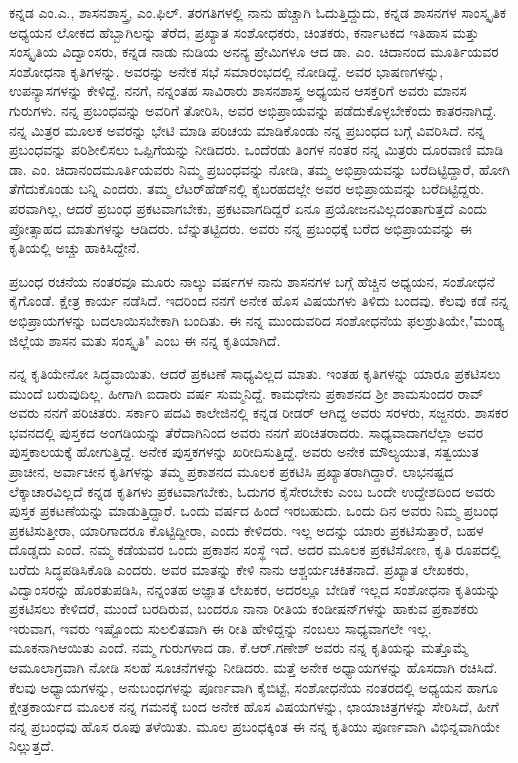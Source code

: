 ಕನ್ನಡ ಎಂ.ಎ., ಶಾಸನಶಾಸ್ತ್ರ, ಎಂ.ಫಿಲ್​. ತರಗತಿಗಳಲ್ಲಿ ನಾನು ಹೆಚ್ಚಾಗಿ ಓದುತ್ತಿದ್ದುದು, ಕನ್ನಡ ಶಾಸನಗಳ ಸಾಂಸ್ಕೃತಿಕ ಅಧ್ಯಯನ ಲೋಕದ ಹೆಬ್ಬಾಗಿಲನ್ನು ತೆರೆದ, ಪ್ರಖ್ಯಾತ ಸಂಶೋಧಕರು, ಚಿಂತಕರು,  ಕರ್ನಾಟಕದ ಇತಿಹಾಸ ಮತ್ತು ಸಂಸ್ಕೃತಿಯ ವಿದ್ವಾಂಸರು, ಕನ್ನಡ ನಾಡು ನುಡಿಯ ಅನನ್ಯ ಪ್ರೇಮಿಗಳೂ ಆದ ಡಾ. ಎಂ. ಚಿದಾನಂದ ಮೂರ್ತಿಯವರ ಸಂಶೋಧನಾ ಕೃತಿಗಳನ್ನು.  ಅವರನ್ನು ಅನೇಕ ಸಭೆ ಸಮಾರಂಭದಲ್ಲಿ ನೋಡಿದ್ದೆ. ಅವರ ಭಾಷಣಗಳನ್ನು, ಉಪನ್ಯಾಸಗಳನ್ನು ಕೇಳಿದ್ದೆ. ನನಗೆ, ನನ್ನಂತಹ ಸಾವಿರಾರು ಶಾಸನಶಾಸ್ತ್ರ ಅಧ್ಯಯನ ಆಸಕ್ತರಿಗೆ ಅವರು ಮಾನಸ ಗುರುಗಳು. ನನ್ನ ಪ್ರಬಂಧವನ್ನು ಅವರಿಗೆ ತೋರಿಸಿ, ಅವರ ಅಭಿಪ್ರಾಯವನ್ನು ಪಡೆದುಕೊಳ್ಳಬೇಕೆಂದು ಕಾತರನಾಗಿದ್ದೆ. ನನ್ನ ಮಿತ್ರರ ಮೂಲಕ ಅವರನ್ನು ಭೇಟಿ ಮಾಡಿ ಪರಿಚಯ ಮಾಡಿಕೊಂಡು ನನ್ನ ಪ್ರಬಂಧದ ಬಗ್ಗೆ ವಿವರಿಸಿದೆ. ನನ್ನ ಪ್ರಬಂಧವನ್ನು ಪರಿಶೀಲಿಸಲು ಒಪ್ಪಿಗೆಯನ್ನು ನೀಡಿದರು. ಒಂದೆರಡು ತಿಂಗಳ ನಂತರ ನನ್ನ ಮಿತ್ರರು ದೂರವಾಣಿ ಮಾಡಿ ಡಾ. ಎಂ. ಚಿದಾನಂದಮೂರ್ತಿಯವರು ನಿಮ್ಮ ಪ್ರಬಂಧವನ್ನು ನೋಡಿ, ತಮ್ಮ ಅಭಿಪ್ರಾಯವನ್ನು ಬರೆದಿಟ್ಟಿದ್ದಾರೆ, ಹೋಗಿ ತೆಗೆದುಕೊಂಡು ಬನ್ನಿ ಎಂದರು. ತಮ್ಮ ಲೆಟರ್​ಹೆಡ್​ನಲ್ಲಿ ಕೈಬರಹದಲ್ಲೇ ಅವರ ಅಭಿಪ್ರಾಯವನ್ನು ಬರೆದಿಟ್ಟಿದ್ದರು.  ಪರವಾಗಿಲ್ಲ, ಆದರೆ ಪ್ರಬಂಧ ಪ್ರಕಟವಾಗಬೇಕು, ಪ್ರಕಟವಾಗದಿದ್ದರೆ ಏನೂ ಪ್ರಯೋಜನವಿಲ್ಲದಂತಾಗುತ್ತದೆ ಎಂದು ಪ್ರೋತ್ಸಾಹದ ಮಾತುಗಳನ್ನು ಆಡಿದರು. ಬೆನ್ನುತಟ್ಟಿದರು. ಅವರು ನನ್ನ ಪ್ರಬಂಧಕ್ಕೆ ಬರೆದ ಅಭಿಪ್ರಾಯವನ್ನು ಈ ಕೃತಿಯಲ್ಲಿ ಅಚ್ಚು ಹಾಕಿಸಿದ್ದೇನೆ.

ಪ್ರಬಂಧ ರಚನೆಯ ನಂತರವೂ ಮೂರು ನಾಲ್ಕು ವರ್ಷಗಳ ನಾನು ಶಾಸನಗಳ ಬಗ್ಗೆ ಹೆಚ್ಚಿನ ಅಧ್ಯಯನ, ಸಂಶೋಧನೆ ಕೈಗೊಂಡೆ. ಕ್ಷೇತ್ರ ಕಾರ್ಯ ನಡೆಸಿದೆ. ಇದರಿಂದ ನನಗೆ ಅನೇಕ ಹೊಸ ವಿಷಯಗಳು ತಿಳಿದು ಬಂದವು. ಕೆಲವು ಕಡೆ ನನ್ನ ಅಭಿಪ್ರಾಯಗಳನ್ನು ಬದಲಾಯಿಸಬೇಕಾಗಿ ಬಂದಿತು. ಈ ನನ್ನ ಮುಂದುವರಿದ ಸಂಶೋಧನೆಯ ಫಲಶ್ರುತಿಯೇ,"ಮಂಡ್ಯ ಜಿಲ್ಲೆಯ ಶಾಸನ ಮತು ಸಂಸ್ಕೃತಿ" ಎಂಬ ಈ ನನ್ನ ಕೃತಿಯಾಗಿದೆ.

ನನ್ನ ಕೃತಿಯೇನೋ ಸಿದ್ಧವಾಯಿತು. ಆದರೆ ಪ್ರಕಟಣೆ ಸಾಧ್ಯವಿಲ್ಲದ ಮಾತು. ಇಂತಹ ಕೃತಿಗಳನ್ನು ಯಾರೂ ಪ್ರಕಟಿ\-ಸಲು ಮುಂದೆ ಬರುವುದಿಲ್ಲ. ಹೀಗಾಗಿ ಐದಾರು ವರ್ಷ ಸುಮ್ಮನಿದ್ದೆ.  ಕಾಮಧೇನು ಪ್ರಕಾಶನದ ಶ್ರೀ ಶಾಮಸುಂದರ ರಾವ್​ ಅವರು ನನಗೆ ಪರಿಚಿತರು.  ಸರ್ಕಾರಿ ಪದವಿ ಕಾಲೇಜಿನಲ್ಲಿ ಕನ್ನಡ ರೀಡರ್​ ಆಗಿದ್ದ ಅವರು ಸರಳರು, ಸಜ್ಜನರು. ಶಾಸಕರ ಭವನದಲ್ಲಿ ಪುಸ್ತಕದ ಅಂಗಡಿಯನ್ನು ತೆರೆದಾಗಿನಿಂದ ಅವರು ನನಗೆ ಪರಿಚಿತರಾದರು. ಸಾಧ್ಯ\-ವಾದಾಗಲೆಲ್ಲಾ ಅವರ ಪುಸ್ತಕಾಲ\-ಯಕ್ಕೆ ಹೋಗುತ್ತಿದ್ದೆ. ಅನೇಕ ಪುಸ್ತಕಗಳನ್ನು ಖರೀದಿಸುತ್ತಿದ್ದೆ. ಅವರು ಅನೇಕ ಮೌಲ್ಯಯುತ, ಸತ್ವಯುತ ಪ್ರಾಚೀನ, ಅರ್ವಾಚೀನ ಕೃತಿಗಳನ್ನು ತಮ್ಮ ಪ್ರಕಾಶನದ ಮೂಲಕ ಪ್ರಕಟಿಸಿ ಪ್ರಖ್ಯಾತರಾಗಿದ್ದಾರೆ. ಲಾಭ\-ನಷ್ಟದ ಲೆಕ್ಕಾಚಾರವಿಲ್ಲದೆ ಕನ್ನಡ ಕೃತಿಗಳು ಪ್ರಕಟವಾಗಬೇಕು, ಓದುಗರ ಕೈಸೇರಬೇಕು ಎಂಬ ಒಂದೇ ಉದ್ದೇಶದಿಂದ ಅವರು ಪುಸ್ತಕ ಪ್ರಕಟಣೆಯನ್ನು ಮಾಡುತ್ತಿದ್ದಾರೆ.  ಒಂದು ವರ್ಷದ ಹಿಂದೆ ಇರಬಹುದು.  ಒಂದು ದಿನ ಅವರು ನಿಮ್ಮ ಪ್ರಬಂಧ ಪ್ರಕಟಿಸು\-ತ್ತೀರಾ, ಯಾರಿಗಾದರೂ ಕೊಟ್ಟಿದ್ದೀರಾ, ಎಂದು ಕೇಳಿದರು. ಇಲ್ಲ ಅದನ್ನು ಯಾರು ಪ್ರಕಟಿಸುತ್ತಾರೆ, ಬಹಳ ದೊಡ್ಡದು ಎಂದೆ. ನಮ್ಮ ಕಡೆಯವರ ಒಂದು ಪ್ರಕಾಶನ ಸಂಸ್ಥೆ ಇದೆ. ಅದರ ಮೂಲಕ ಪ್ರಕಟಿಸೋಣ, ಕೃತಿ ರೂಪದಲ್ಲಿ ಬರೆದು ಸಿದ್ಧಪಡಿಸಿಕೊಡಿ ಎಂದರು. ಅವರ ಮಾತನ್ನು ಕೇಳಿ ನಾನು ಆಶ್ಚರ್ಯಚಕಿತನಾದೆ. ಪ್ರಖ್ಯಾತ ಲೇಖಕರು, ವಿದ್ವಾಂಸರನ್ನು ಹೊರತುಪಡಿಸಿ, ನನ್ನಂತಹ ಅಜ್ಞಾತ ಲೇಖಕರ, ಅದರಲ್ಲೂ ಬೇಡಿಕೆ ಇಲ್ಲದ ಸಂಶೋಧನಾ ಕೃತಿಯನ್ನು ಪ್ರಕಟಿಸಲು ಕೇಳಿದರೆ, ಮುಂದೆ ಬರದಿರುವ, ಬಂದರೂ ನಾನಾ ರೀತಿಯ ಕಂಡೀಷನ್​ಗಳನ್ನು ಹಾಕುವ ಪ್ರಕಾಶಕರು ಇರುವಾಗ, ಇವರು ಇಷ್ಟೊಂದು ಸುಲಲಿತವಾಗಿ ಈ ರೀತಿ ಹೇಳಿದ್ದನ್ನು ನಂಬಲು ಸಾಧ್ಯವಾಗಲೇ ಇಲ್ಲ. ಮೂಕನಾಗಿ\break ಆಯಿತು ಎಂದೆ. ನಮ್ಮ ಗುರುಗಳಾದ ಡಾ. ಕೆ.ಆರ್​.ಗಣೇಶ್​ ಅವರು ನನ್ನ ಕೃತಿಯನ್ನು ಮತ್ತೊಮ್ಮೆ ಆಮೂಲಾಗ್ರವಾಗಿ ನೋಡಿ ಸಲಹೆ ಸೂಚನೆಗಳನ್ನು ನೀಡಿದರು. ಮತ್ತೆ ಅನೇಕ ಅಧ್ಯಾಯಗಳನ್ನು ಹೊಸದಾಗಿ ರಚಿಸಿದೆ. ಕೆಲವು ಅಧ್ಯಾಯಗಳನ್ನು, ಅನು\-ಬಂಧಗಳನ್ನು ಪೂರ್ಣವಾಗಿ ಕೈಬಿಟ್ಟೆ, ಸಂಶೋಧನೆಯ ನಂತರದಲ್ಲಿ  ಅಧ್ಯಯನ ಹಾಗೂ ಕ್ಷೇತ್ರಕಾರ್ಯದ ಮೂಲಕ  ನನ್ನ ಗಮನಕ್ಕೆ ಬಂದ ಅನೇಕ ಹೊಸ ವಿಷಯಗಳನ್ನು, ಛಾಯಾಚಿತ್ರಗಳನ್ನು ಸೇರಿಸಿದೆ, ಹೀಗೆ ನನ್ನ ಪ್ರಬಂಧವು ಹೊಸ ರೂಪು ತಳೆಯಿತು. ಮೂಲ ಪ್ರಬಂಧಕ್ಕಿಂತ ಈ ನನ್ನ ಕೃತಿಯು ಪೂರ್ಣವಾಗಿ ವಿಭಿನ್ನವಾಗಿಯೇ ನಿಲ್ಲುತ್ತದೆ.

